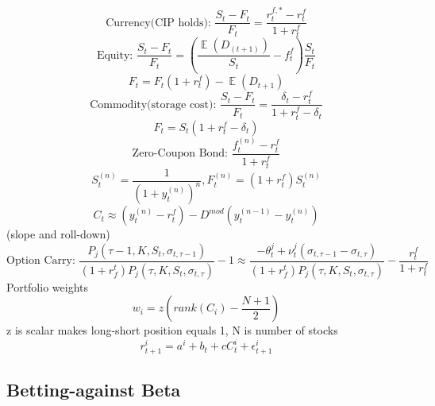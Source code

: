 \documentclass[11pt, openany]{book}              %
\DeclareMathOperator{\E}{\mathbb{E}}
\begin{document}
\begin{itemize}
	\subitem $$\text{Currency(CIP holds): }  \frac{S_t - F_t}{F_t} = \frac{r_t^{f,*} - r_t^f}{1+r_t^f} $$
	\subitem $$\text{Equity: } \frac{S_t - F_t}{F_t} =(\frac{ \E(D_(t+1))}{S_t} - f_t^f) \frac{S_t}{F_t}$$ $$F_t = F_t(1+r_t^f) - \E(D_{t+1})$$
	\subitem $$\text{Commodity(storage cost): } \frac{S_t - F_t}{F_t} = \frac{\delta_t - r^f_t}{1+r^f_t - \delta_t}$$ $$F_t = S_t(1+r_t^f - \delta_t)$$
	\subitem $$\text{Zero-Coupon Bond: }\frac{f_t^{(n)} - r_t^f}{1+ r_t^f} $$
	 $$S_t^{(n)} = \frac{1}{(1+y_t^{(n)})^n}, F_t^{(n)} = (1+r_t^f) S_t^{(n)} $$
	 $$C_t \approx (y_t^{(n)} - r_t^f) - D^{mod}( y_t^{(n-1)} - y_t^{(n)})$$ (slope and roll-down)
	 \subitem $$\text{Option Carry: }	 \frac{P_j(\tau -1, K, S_t, \sigma_{t,\tau-1})}{(1+r_f^t)P_j(\tau, K, S_t, \sigma_{t,\tau})} - 1 \approx \frac{-\theta_t^j + \nu_t^j(  \sigma_{t,\tau - 1} - \sigma_{t,\tau})}{(1+r_f^t)P_j(\tau, K, S_t, \sigma_{t,\tau})} - \frac{r^f_t}{1+r_t^f}$$
	 Portfolio weights
	 $$ w_i = z (rank(C_i) - \frac{N+1}{2})$$
	 z is scalar makes long-short position equals 1, N is number of stocks
	 $$ r_{t+1}^i = a^i + b_t + c C_t^i + \epsilon_{t+1}^i$$
\end{itemize}

\subsection{Betting-against Beta}
\end{document}
